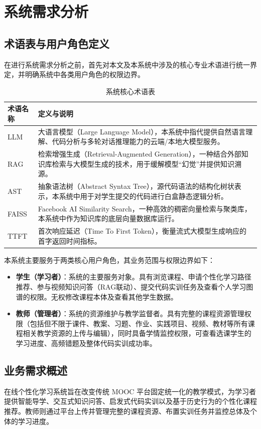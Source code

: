 \chapter{系统需求分析}

\section{术语表与用户角色定义}

在进行系统需求分析之前，首先对本文及本系统中涉及的核心专业术语进行统一界定，并明确系统中各类用户角色的权限边界。

\begin{table}[htbp]
\centering
\caption{系统核心术语表}
\label{tab:glossary}
\begin{tabular}{lp{10cm}}
\toprule
\textbf{术语名称} & \textbf{定义与说明} \\
\midrule
LLM & 大语言模型（Large Language Model），本系统中指代提供自然语言理解、代码分析与多轮对话推理能力的云端/本地大模型服务。 \\
RAG & 检索增强生成（Retrieval-Augmented Generation），一种结合外部知识库检索与大模型生成的技术，用于缓解模型“幻觉”并提供知识溯源。 \\
AST & 抽象语法树（Abstract Syntax Tree），源代码语法的结构化树状表示，本系统中用于对学生提交的代码进行白盒静态逻辑分析。 \\
FAISS & Facebook AI Similarity Search，一种高效的稠密向量检索与聚类库，本系统中作为知识库的底层向量数据库运行。 \\
TTFT & 首次响应延迟（Time To First Token），衡量流式大模型生成响应的首字返回时间指标。 \\
\bottomrule
\end{tabular}
\end{table}

本系统主要服务于两类核心用户角色，其业务范围与权限边界如下：
\begin{itemize}
    \item \textbf{学生（学习者）}：系统的主要服务对象。具有浏览课程、申请个性化学习路径推荐、参与视频知识问答（RAG联动）、提交代码实训任务及查看个人学习图谱的权限。无权修改课程本体及查看其他学生数据。
    \item \textbf{教师（管理者）}：系统的资源维护与教学监督者。具有完整的课程资源管理权限（包括但不限于课件、教案、习题、作业、实践项目、视频、教材等所有课程相关教学资源的上传与编辑），同时具备学情监控权限，可查看选课学生的学习进度、高频错题及整体代码实训成功率。
\end{itemize}

\section{业务需求概述}
在线个性化学习系统旨在改变传统 MOOC 平台固定统一化的教学模式，为学习者提供智能导学、交互式知识问答、启发式代码实训以及基于历史行为的个性化课程推荐。教师则通过平台上传并管理完整的课程资源、布置实训任务并监控总体及个体的学习进度。

